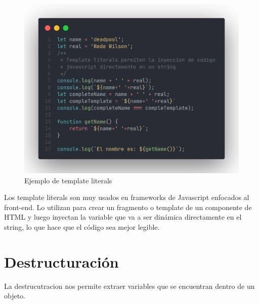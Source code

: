 \documentclass[12pt]{article}
\begin{document}
\begin{figure}[H]
	\centering
	\includegraphics[scale=.3]{assets/images/template-literals.png}
	\caption{Ejemplo de template literals}
\end{figure}

Los template literals son muy usados en frameworks de Javascript enfocados al front-end. Lo utilizan para crear un fragmento o template de un componente de HTML y luego inyectan la variable que va a ser dinámica directamente en el string, lo que hace que el código sea mejor legible.



\newpage

\section{Destructuración}

La destrucutracion nos permite extraer variables que se encuentran dentro de un objeto. 
\end{document}
